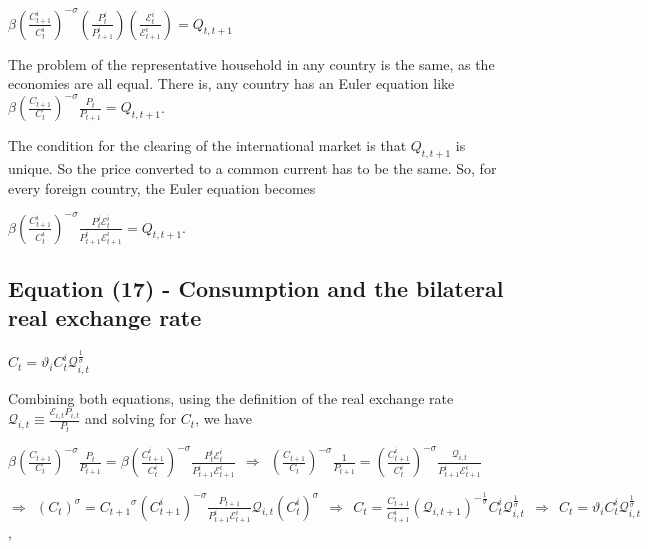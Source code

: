 \documentclass[
]{article}
\begin{document}
\(\displaystyle \beta \left( \frac{C_{t+1}^i}{C_t^i} \right)^{-\sigma} \left(\frac{P_t^i }{P_{t+1}^i}\right) \left(\frac{ \mathcal{E}_t^i}{ \mathcal{E}_{t+1}^i}\right) = Q_{t,t+1}\)

\vspace{8pt}

The problem of the representative household in any country is the same,
as the economies are all equal. There is, any country has an Euler
equation like
\(\displaystyle \beta \left( \frac{C_{t+1}}{C_t} \right)^{-\sigma} \frac{P_t}{P_{t+1}}= Q_{t,t+1}\).

The condition for the clearing of the international market is that
\(Q_{t,t+1}\) is unique. So the price converted to a common current has
to be the same. So, for every foreign country, the Euler equation
becomes

\(\displaystyle \beta \left( \frac{C_{t+1}^i}{C_t^i} \right)^{-\sigma} \frac{P_t^i \mathcal{E}_t^i}{P_{t+1}^i \mathcal{E}_{t+1}^i} = Q_{t,t+1}\).

\vspace{12pt}

\hypertarget{equation-17---consumption-and-the-bilateral-real-exchange-rate}{%
\subsection{Equation (17) - Consumption and the bilateral real exchange
rate}\label{equation-17---consumption-and-the-bilateral-real-exchange-rate}}

\(C_t = \vartheta_i C_t^i \mathcal{Q}_{i,t}^\frac{1}{\sigma}\)

\vspace{8pt}

Combining both equations, using the definition of the real exchange rate
\(\displaystyle \mathcal{Q}_{i,t} \equiv \frac{\mathcal{E}_{i,t}P_{i,t}}{P_t}\)
and solving for \(C_t\), we have

\(\displaystyle \beta \left( \frac{C_{t+1}}{C_t} \right)^{-\sigma} \frac{P_t}{P_{t+1}} = \beta \left( \frac{C_{t+1}^i}{C_t^i} \right)^{-\sigma} \frac{P_t^i \mathcal{E}_t^i}{P_{t+1}^i \mathcal{E}_{t+1}^i} \ \ \Rightarrow \ \ \left( \frac{C_{t+1}}{C_t} \right)^{-\sigma} \frac{1}{P_{t+1}} = \left( \frac{C_{t+1}^i}{C_t^i} \right)^{-\sigma} \frac{\mathcal{Q}_{i,t}}{P_{t+1}^i \mathcal{E}_{t+1}^i}\)

\(\displaystyle \Rightarrow \ \ (C_t)^\sigma = {C_{t+1}}^\sigma \left( C_{t+1}^i \right)^{-\sigma} \frac{P_{t+1}}{P_{t+1}^i \mathcal{E}_{t+1}^i}\mathcal{Q}_{i,t}(C_t^i)^\sigma \ \ \Rightarrow \ \ C_t = \frac{C_{t+1}}{C_{t+1}^i} (\mathcal{Q}_{i,t+1})^{-\frac{1}{\sigma}} C_t^i \mathcal{Q}_{i,t}^\frac{1}{\sigma} \ \ \Rightarrow \ \ C_t = \vartheta_i C_t^i \mathcal{Q}_{i,t}^\frac{1}{\sigma}\),
\end{document}
